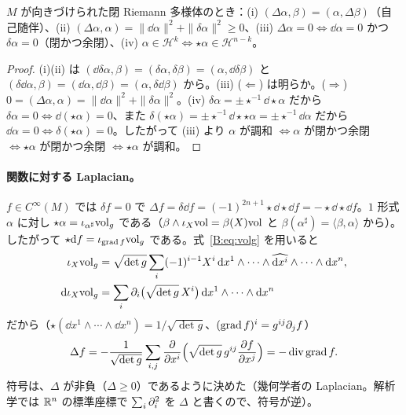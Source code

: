 \begin{prop}\label{B:prop:Lap}\tP
$M$ が向きづけられた閉 Riemann 多様体のとき：(i) $(\Delta\alpha,\beta)=(\alpha,\Delta\beta)$（自己随伴）、(ii) $(\Delta\alpha,\alpha)=\|\dd\alpha\|^2+\|\delta\alpha\|^2\ge0$、(iii) $\Delta\alpha=0\iff\dd\alpha=0$ かつ $\delta\alpha=0$（閉かつ余閉）、(iv) $\alpha\in\mathcal H^k\iff\star\alpha\in\mathcal H^{n-k}$。
\end{prop}
\begin{proof}
(i)(ii) は $(\dd\delta\alpha,\beta)=(\delta\alpha,\delta\beta)=(\alpha,\dd\delta\beta)$ と $(\delta\dd\alpha,\beta)=(\dd\alpha,\dd\beta)=(\alpha,\delta\dd\beta)$ から。(iii) ($\Leftarrow$) は明らか。($\Rightarrow$) $0=(\Delta\alpha,\alpha)=\|\dd\alpha\|^2+\|\delta\alpha\|^2$。(iv) $\delta\alpha=\pm\star^{-1}\dd\star\alpha$ だから $\delta\alpha=0\iff\dd(\star\alpha)=0$、また $\delta(\star\alpha)=\pm\star^{-1}\dd\star\star\alpha=\pm\star^{-1}\dd\alpha$ だから $\dd\alpha=0\iff\delta(\star\alpha)=0$。したがって (iii) より $\alpha$ が調和 $\iff\alpha$ が閉かつ余閉 $\iff\star\alpha$ が閉かつ余閉 $\iff\star\alpha$ が調和。
\end{proof}

\paragraph{関数に対する Laplacian。}$f\in C^\infty(M)$ では $\delta f=0$ で $\Delta f=\delta\dd f=(-1)^{2n+1}\star\dd\star\dd f=-\star\dd\star\dd f$。$1$ 形式 $\alpha$ に対し $\star\alpha=\iota_{\alpha^\sharp}\mathrm{vol}_g$ である（$\beta\wedge\iota_X\mathrm{vol}=\beta(X)\mathrm{vol}$ と $\beta(\alpha^\sharp)=\langle\beta,\alpha\rangle$ から）。したがって $\star\mathrm{d} f=\iota_{\operatorname{grad} f}\mathrm{vol}_g$ である。式~\eqref{B:eq:volg} を用いると
\begin{align*}
\iota_X\mathrm{vol}_g&=\sqrt{\det g}\sum_i(-1)^{i-1}X^i\,\mathrm{d} x^1\wedge\cdots\wedge\widehat{\mathrm{d} x^i}\wedge\cdots\wedge\mathrm{d} x^n,\\
\mathrm{d}\iota_X\mathrm{vol}_g&=\sum_i\partial_i\bigl(\sqrt{\det g}\,X^i\bigr)\,\mathrm{d} x^1\wedge\cdots\wedge\mathrm{d} x^n
\end{align*}
だから（$\star(\dd x^1\wedge\cdots\wedge\dd x^n)=1/\sqrt{\det g}$、$(\operatorname{grad} f)^i=g^{ij}\partial_jf$）
\begin{equation}\label{B:eq:laplacefn}
\Delta f=-\frac1{\sqrt{\det g}}\sum_{i,j}\frac{\partial}{\partial x^i}\Bigl(\sqrt{\det g}\,g^{ij}\frac{\partial f}{\partial x^j}\Bigr)=-\operatorname{div}\operatorname{grad} f .
\end{equation}
符号は、$\Delta$ が非負（$\Delta\ge0$）であるように決めた（幾何学者の Laplacian。解析学では $\mathbb R^n$ の標準座標で $\sum_i\partial_i^2$ を $\Delta$ と書くので、符号が逆）。


